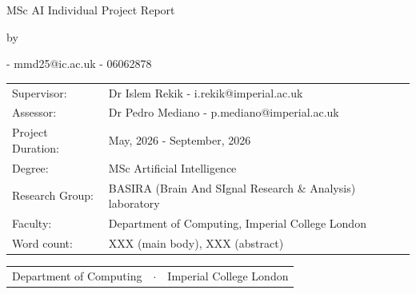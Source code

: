 \begin{titlepage}

\begin{center}

{\makeatletter
\largetitlestyle\fontsize{35}{35}\selectfont\@title
\makeatother}

\bigskip

{\makeatletter
\vspace{12mm}
\ifdefvoid{\@subtitle}{}{\largetitlestyle\fontsize{25}{25}\selectfont\@subtitle}
\makeatother}

\bigskip
\bigskip

MSc AI Individual Project Report

\bigskip
\bigskip

by

\bigskip
\bigskip

{\makeatletter
\largetitlestyle\fontsize{18}{18}\selectfont\@author - mmd25@ic.ac.uk - 
06062878
\makeatother}

\bigskip
\bigskip


\vfill

\begin{tabular}{ll}
    Supervisor: & Dr Islem Rekik    -   i.rekik@imperial.ac.uk \\
    Assessor: & Dr Pedro Mediano   -   p.mediano@imperial.ac.uk \\
    Project Duration: & May, 2026 - September, 2026 \\
    Degree: & MSc Artificial Intelligence \\
    Research Group: & BASIRA (Brain And SIgnal Research \& Analysis) laboratory \\
    Faculty: & Department of Computing, Imperial College London \\
    Word count: & XXX (main body), XXX (abstract)
\end{tabular}

\vspace*{1cm}

\vspace*{2cm}
  \begin{center}
    \begin{tabular}{lcr}
      Department of Computing & $\cdot$ & Imperial College London
    \end{tabular}
  \end{center}

\end{center}

\end{titlepage}
